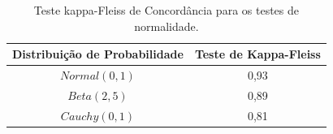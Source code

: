 \documentclass[final]{beamer}
\begin{document}
\begin{frame}[t]
\begin{columns}[t,totalwidth=0.6\paperwidth]
\begin{column}{0.45\paperwidth}
\begin{table}[H]
\centering
 \setlength{\tabcolsep}{8pt}
    \renewcommand{\arraystretch}{1.25}
\caption{Teste kappa-Fleiss de Concordância para os testes de normalidade.}
   \begin{tabular}{c|c}
\toprule
Distribuição de Probabilidade  &  Teste de Kappa-Fleiss \\
\midrule
$Normal(0, 1)$  &  0,93  \\
$Beta(2, 5)$    &  0,89  \\
$Cauchy(0, 1)$  &  0,81  \\
\bottomrule
\end{tabular}
    \label{tab:resultKappaFleiss}
\end{table}


\vspace{0.5cm}



\end{column}
\end{columns}
\end{frame}
\end{document}
